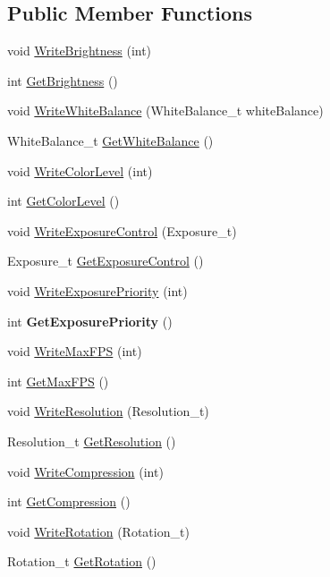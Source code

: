 \subsection*{Public Member Functions}
\begin{DoxyCompactItemize}
\item 
void \hyperlink{classAxisCameraParams_a7fd3c5fc07e8f0e6dd323cf964409b35}{WriteBrightness} (int)
\item 
int \hyperlink{classAxisCameraParams_a1ed50b120204eea065a0b826583ada36}{GetBrightness} ()
\item 
void \hyperlink{classAxisCameraParams_a3d167599fd9deb2be3db6b6710eeb966}{WriteWhiteBalance} (WhiteBalance\_\-t whiteBalance)
\item 
WhiteBalance\_\-t \hyperlink{classAxisCameraParams_a8882b5443c334290f9ab8e623c9a3808}{GetWhiteBalance} ()
\item 
void \hyperlink{classAxisCameraParams_a7e30277c5bbae801f4c2f7a878812e23}{WriteColorLevel} (int)
\item 
int \hyperlink{classAxisCameraParams_a9b39e22cc32acca291c4a30261d8a757}{GetColorLevel} ()
\item 
void \hyperlink{classAxisCameraParams_ae926afa551f52066170d60d60b9ca2ad}{WriteExposureControl} (Exposure\_\-t)
\item 
Exposure\_\-t \hyperlink{classAxisCameraParams_a4c1c2dbac6e7c2584b1f2383fed2aa8a}{GetExposureControl} ()
\item 
void \hyperlink{classAxisCameraParams_ac8910a14a43f6e175abb1ee481e2c512}{WriteExposurePriority} (int)
\item 
\hypertarget{classAxisCameraParams_a4357e2b510c111b310f3ed3dba8c32b5}{
int {\bfseries GetExposurePriority} ()}
\label{classAxisCameraParams_a4357e2b510c111b310f3ed3dba8c32b5}

\item 
void \hyperlink{classAxisCameraParams_a47f7e3af5902af073b294602b81105d5}{WriteMaxFPS} (int)
\item 
int \hyperlink{classAxisCameraParams_aa20be419668fcadc2358c452700242df}{GetMaxFPS} ()
\item 
void \hyperlink{classAxisCameraParams_a4c51df266cdd5e23b8098b995aea64a8}{WriteResolution} (Resolution\_\-t)
\item 
Resolution\_\-t \hyperlink{classAxisCameraParams_a3c5895df6d60c62c44dfbbe8dd6ebfe6}{GetResolution} ()
\item 
void \hyperlink{classAxisCameraParams_a6b834280394c194f2890745348912792}{WriteCompression} (int)
\item 
int \hyperlink{classAxisCameraParams_ae751dec06a4ebebc2777b0210791283d}{GetCompression} ()
\item 
void \hyperlink{classAxisCameraParams_aa6e7b6f0d86231add3588977eed08109}{WriteRotation} (Rotation\_\-t)
\item 
Rotation\_\-t \hyperlink{classAxisCameraParams_a6ede159b8dc37561bc47b6631fd99037}{GetRotation} ()
\end{DoxyCompactItemize}
